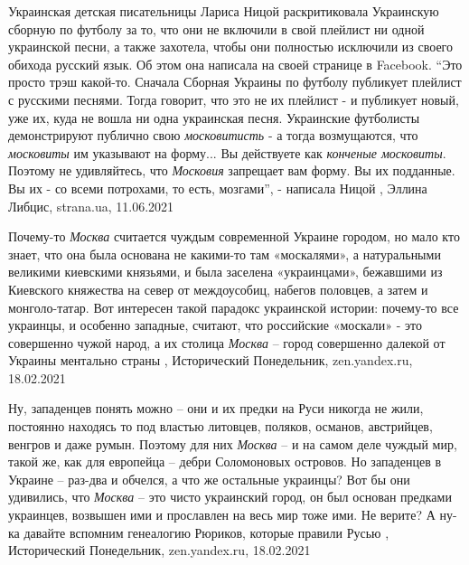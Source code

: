 Украинская детская писательницы Лариса Ницой раскритиковала Украинскую сборную
по футболу за то, что они не включили в свой плейлист ни одной украинской
песни, а также захотела, чтобы они полностью исключили из своего обихода
русский язык.  Об этом она написала на своей странице в Facebook.  \enquote{Это
просто трэш какой-то. Сначала Сборная Украины по футболу публикует плейлист с
русскими песнями. Тогда говорит, что это не их плейлист - и публикует новый,
уже их, куда не вошла ни одна украинская песня. Украинские футболисты
демонстрируют публично свою \emph{московитисть} - а тогда возмущаются, что
\emph{московиты} им указывают на форму... Вы действуете как \emph{конченые
московиты}. Поэтому не удивляйтесь, что \emph{Московия} запрещает вам форму. Вы
их подданные. Вы их - со всеми потрохами, то есть, мозгами}, - написала Ницой
, Эллина Либцис, strana.ua, 11.06.2021

Почему-то \emph{Москва} считается чуждым современной Украине городом, но мало
кто знает, что она была основана не какими-то там «москалями», а натуральными
великими киевскими князьями, и была заселена «украинцами», бежавшими из
Киевского княжества на север от междоусобиц, набегов половцев, а затем и
монголо-татар. Вот интересен такой парадокс украинской истории: почему-то все
украинцы, и особенно западные, считают, что российские «москали» - это
совершенно чужой народ, а их столица \emph{Москва} – город совершенно далекой от
Украины ментально страны
, 
Исторический Понедельник, zen.yandex.ru, 18.02.2021

Ну, западенцев понять можно – они и их предки на Руси никогда не жили,
постоянно находясь то под властью литовцев, поляков, османов, австрийцев,
венгров и даже румын. Поэтому для них \emph{Москва} – и на самом деле чуждый мир,
такой же, как для европейца – дебри Соломоновых островов.  Но западенцев в
Украине – раз-два и обчелся, а что же остальные украинцы? Вот бы они удивились,
что \emph{Москва} – это чисто украинский город, он был основан предками украинцев,
возвышен ими и прославлен на весь мир тоже ими. Не верите? А ну-ка давайте
вспомним генеалогию Рюриков, которые правили Русью
, 
Исторический Понедельник, zen.yandex.ru, 18.02.2021

